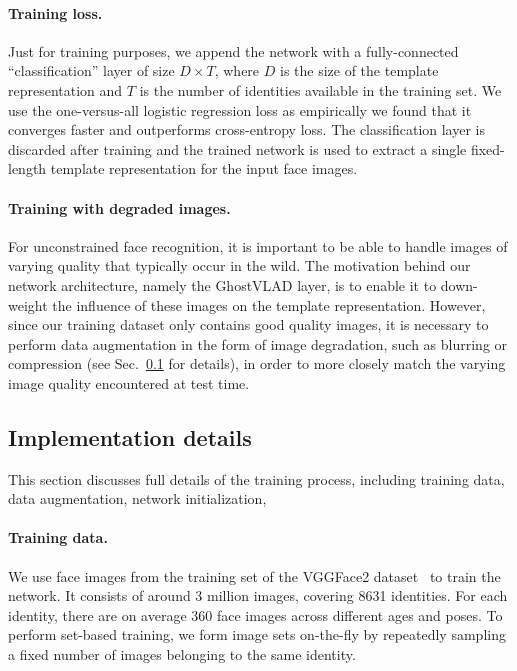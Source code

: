 \documentclass[runningheads]{llncs}
\begin{document}
\paragraph{Training loss.}
Just for training purposes, we append the network with a fully-connected
``classification'' layer of size $D \times T$, where $D$ is the size
of the template representation and $T$ is the number of identities
available in the training set.
We use the one-versus-all logistic regression loss as empirically
we found that it converges faster and
outperforms cross-entropy loss.
The classification layer is discarded after training and the trained network
is used to extract a single fixed-length template representation
for the input face images.





\paragraph{Training with degraded images.}
For unconstrained face recognition, it is important to be able to handle
images of varying quality that typically occur in the wild.
The motivation behind our network architecture, namely the GhostVLAD layer,
is to enable it to down-weight the influence
of these images on the template representation.
However, since our training dataset only contains good quality images,
it is necessary to perform data augmentation in the form of image degradation,
such as blurring or compression (see Sec.~\ref{sec:imp} for details),
in order to more closely match the varying image quality encountered
at test time.


\subsection{Implementation details}
\label{sec:imp}
This section discusses full details of the 
training process, including training data,
data augmentation,
network initialization, \etc

\paragraph{Training data.} 
We use face images from the training set of the
VGGFace2 dataset~\cite{Cao18} to train the network.
It consists of around 3 million images, covering 
8631 identities. For 
each identity, there are on average 360 face 
images across different ages and poses.
To perform set-based training,
we form image sets on-the-fly by repeatedly sampling
a fixed number of images belonging to the same identity.
\end{document}

